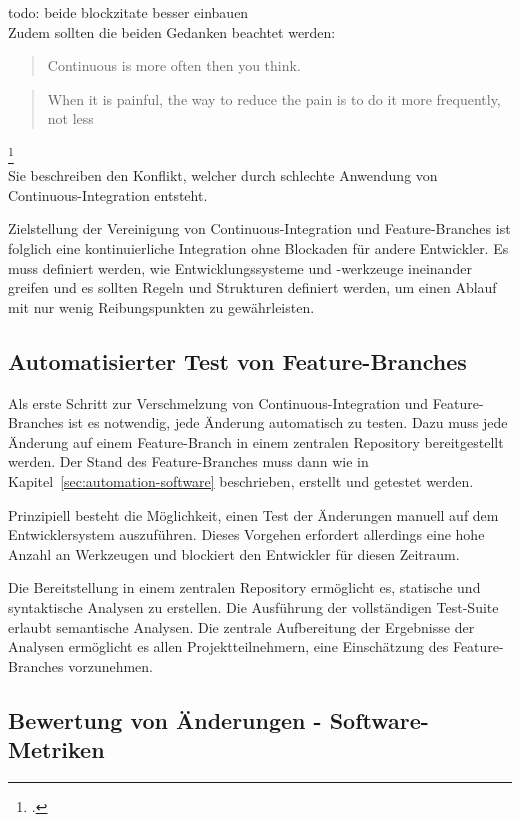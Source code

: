 todo: beide blockzitate besser einbauen\\

Zudem sollten die beiden Gedanken beachtet werden:\\

\blockquote {Continuous is more often then you think.} 
 
\blockquote {When it is painful, the way to reduce the pain is to do it more frequently, not less}\footcite[S.24][]{humble2010} \\

Sie beschreiben den Konflikt, welcher durch schlechte Anwendung von Continuous-Integration entsteht. 

Zielstellung der Vereinigung von Continuous-Integration und Feature-Branches ist folglich eine kontinuierliche Integration ohne Blockaden für andere Entwickler. Es muss definiert werden, wie Entwicklungssysteme und -werkzeuge ineinander greifen und es sollten Regeln und Strukturen definiert werden, um einen Ablauf mit nur wenig Reibungspunkten zu gewährleisten.

\subsection{Automatisierter Test von Feature-Branches}

Als erste Schritt zur Verschmelzung von Continuous-Integration und Feature-Branches ist es notwendig, jede Änderung automatisch zu testen. Dazu muss jede Änderung auf einem Feature-Branch in einem zentralen Repository bereitgestellt werden. Der Stand des Feature-Branches muss dann wie in Kapitel~\ref{sec:automation-software}  beschrieben, erstellt und getestet werden.

Prinzipiell besteht die Möglichkeit, einen Test der Änderungen manuell auf dem Entwicklersystem auszuführen. Dieses Vorgehen erfordert allerdings eine hohe Anzahl an Werkzeugen und blockiert den Entwickler für diesen Zeitraum.

Die Bereitstellung in einem zentralen Repository ermöglicht es, statische und syntaktische Analysen zu erstellen. Die Ausführung der vollständigen Test-Suite erlaubt semantische Analysen. Die zentrale Aufbereitung der Ergebnisse der Analysen ermöglicht es allen Projektteilnehmern, eine Einschätzung des Feature-Branches vorzunehmen.

\subsection{Bewertung von Änderungen - Software-Metriken}
\label{subsec:main-metrics}

